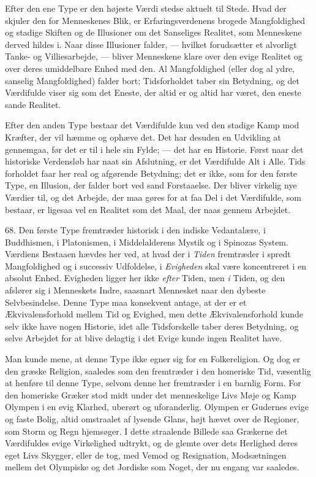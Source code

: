 \documentclass[12pt,a4paper,openany]{book}
\newcommand{\opage}[1]{\marginnote{\footnotesize\textit{[#1]}}}
\begin{document}
Efter den ene Type er den højeste Værdi stedse aktuelt til Stede. Hvad
der skjuler den for Menneskenes Blik, er Erfaringsverdenens brogede
Mangfoldighed og stadige Skiften og de Illusioner om det Sanseliges
Realitet, som Menneskene derved hildes i. Naar disse Illusioner falder,
--- hvilket forudsætter et alvorligt Tanke- og Villiesarbejde, ---
bliver Menneskene klare over den evige Realitet og over deres
umiddelbare Enhed med den. Al Mangfoldighed (eller dog al ydre, sanselig
Mangfoldighed) falder bort; Tidsforholdet taber sin Betydning, og det
Værdifulde viser sig som det Eneste, der altid er og altid har været,
den eneste sande Realitet.

Efter den anden Type bestaar det Værdifulde kun ved den stadige Kamp mod
Kræfter, der vil hæmme og ophæve det. Det har desuden en Udvikling at
gennemgaa, før det er til i hele sin Fylde; --- det har en Historie.
Først naar det historiske Verdensløb har naat sin Afslutning, er det
Værdifulde Alt i Alle. Tids%
\opage{155}forholdet faar her real og afgørende Betydning; det er ikke,
som for den første Type, en Illusion, der falder bort ved sand
Forstaaelse. Der bliver virkelig nye Værdier til, og det Arbejde, der
maa gøres for at faa Del i det Værdifulde, som bestaar, er ligesaa vel
en Realitet som det Maal, der naas gennem Arbejdet.

68. Den første Type fremtræder historisk i den indiske Vedantalære, i
Buddhismen, i Platonismen, i Middelalderens Mystik og i Spinozas System.
Værdiens Bestaaen hævdes her ved, at hvad der i \textit{Tiden}
fremtræder i spredt Mangfoldighed og i successiv Udfoldelse, i
\textit{Evigheden} skal være koncentreret i en absolut Enhed. Evigheden
ligger her ikke \textit{efter} Tiden, men \textit{i} Tiden, og den
afslører sig i Menneskets Indre, saasnart Mennesket naar den dybeste
Selvbesindelse. Denne Type maa konsekvent antage, at der er et
Ækvivalensforhold mellem Tid og Evighed, men dette Ækvivalensforhold
kunde selv ikke have nogen Historie, idet alle Tidsforskelle taber deres
Betydning, og selve Arbejdet for at blive delagtig i det Evige kunde
ingen Realitet have.

Man kunde mene, at denne Type ikke egner sig for en Folkereligion. Og
dog er den græske Religion, saaledes som den fremtræder i den homeriske
Tid, væsentlig at henføre til denne Type, selvom denne her fremtræder i
en barnlig Form. For den homeriske Græker stod midt under det
menneskelige Livs Møje og Kamp Olympen i en evig Klarhed, uberørt og
uforanderlig. Olympen er Gudernes evige og faste Bolig, altid omstraalet
af lysende Glans, højt hævet over de Regioner, som Storm og Regn
hjemsøger. I dette straalende Billede saa Grækerne det Værdifuldes evige
Virkelighed udtrykt, og de glemte over dets Herlighed deres eget Livs
Skygger, eller de tog, med Vemod og Resignation, Modsætningen mellem det
Olympiske og det Jordiske som Noget, der nu engang var saaledes.
\end{document}
